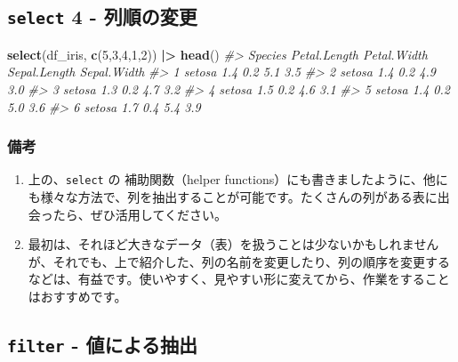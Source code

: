 \documentclass[
  xelatex, ja=standard]{bxjsbook}
\newenvironment{Shaded}{\begin{snugshade}}{\end{snugshade}}
\newcommand{\CommentTok}[1]{\textcolor[rgb]{0.56,0.35,0.01}{\textit{#1}}}
\newcommand{\DecValTok}[1]{\textcolor[rgb]{0.00,0.00,0.81}{#1}}
\newcommand{\FunctionTok}[1]{\textcolor[rgb]{0.13,0.29,0.53}{\textbf{#1}}}
\newcommand{\NormalTok}[1]{#1}
\newcommand{\SpecialCharTok}[1]{\textcolor[rgb]{0.81,0.36,0.00}{\textbf{#1}}}
\providecommand{\tightlist}{%
  \setlength{\itemsep}{0pt}\setlength{\parskip}{0pt}}
\theoremstyle{definition}
\theoremstyle{definition}
\theoremstyle{definition}
\theoremstyle{definition}
\theoremstyle{remark}
\begin{document}
\hypertarget{select-4---ux5217ux9806ux306eux5909ux66f4}{%
\subsection{\texorpdfstring{\texttt{select} 4 - 列順の変更}{select 4 - 列順の変更}}\label{select-4---ux5217ux9806ux306eux5909ux66f4}}

\begin{Shaded}
\begin{Highlighting}[]
\FunctionTok{select}\NormalTok{(df\_iris, }\FunctionTok{c}\NormalTok{(}\DecValTok{5}\NormalTok{,}\DecValTok{3}\NormalTok{,}\DecValTok{4}\NormalTok{,}\DecValTok{1}\NormalTok{,}\DecValTok{2}\NormalTok{)) }\SpecialCharTok{|\textgreater{}} \FunctionTok{head}\NormalTok{()}
\CommentTok{\#\textgreater{}   Species Petal.Length Petal.Width Sepal.Length Sepal.Width}
\CommentTok{\#\textgreater{} 1  setosa          1.4         0.2          5.1         3.5}
\CommentTok{\#\textgreater{} 2  setosa          1.4         0.2          4.9         3.0}
\CommentTok{\#\textgreater{} 3  setosa          1.3         0.2          4.7         3.2}
\CommentTok{\#\textgreater{} 4  setosa          1.5         0.2          4.6         3.1}
\CommentTok{\#\textgreater{} 5  setosa          1.4         0.2          5.0         3.6}
\CommentTok{\#\textgreater{} 6  setosa          1.7         0.4          5.4         3.9}
\end{Highlighting}
\end{Shaded}

\hypertarget{ux5099ux8003-3}{%
\subsubsection{備考}\label{ux5099ux8003-3}}

\begin{enumerate}
\def\labelenumi{\arabic{enumi}.}
\tightlist
\item
  上の、\texttt{select} の 補助関数（helper functions）にも書きましたように、他にも様々な方法で、列を抽出することが可能です。たくさんの列がある表に出会ったら、ぜひ活用してください。
\item
  最初は、それほど大きなデータ（表）を扱うことは少ないかもしれませんが、それでも、上で紹介した、列の名前を変更したり、列の順序を変更するなどは、有益です。使いやすく、見やすい形に変えてから、作業をすることはおすすめです。
\end{enumerate}

\hypertarget{filter---ux5024ux306bux3088ux308bux62bdux51fa}{%
\subsection{\texorpdfstring{\texttt{filter} - 値による抽出}{filter - 値による抽出}}\label{filter---ux5024ux306bux3088ux308bux62bdux51fa}}
\end{document}
